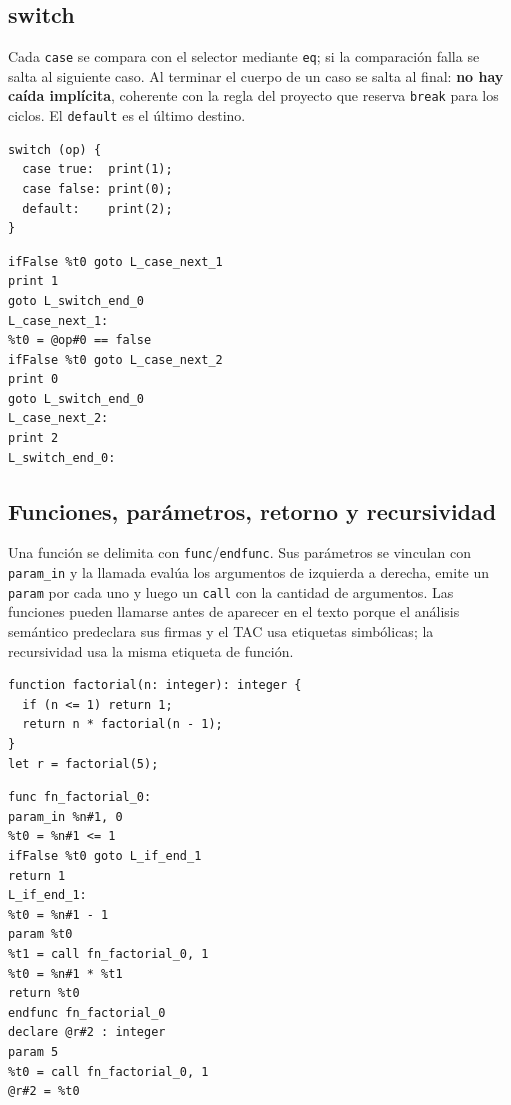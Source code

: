 \documentclass[11pt,a4paper]{article}
\begin{document}
\subsection{switch}

Cada \texttt{case} se compara con el selector mediante \texttt{eq}; si la
comparación falla se salta al siguiente caso. Al terminar el cuerpo de un caso
se salta al final: \textbf{no hay caída implícita}, coherente con la regla del
proyecto que reserva \texttt{break} para los ciclos. El \texttt{default} es el
último destino.

\noindent
\begin{minipage}[t]{0.40\textwidth}
\begin{lstlisting}[language=Compiscript,style=sinnumero]
switch (op) {
  case true:  print(1);
  case false: print(0);
  default:    print(2);
}
\end{lstlisting}
\end{minipage}\hfill
\begin{minipage}[t]{0.54\textwidth}
\begin{lstlisting}[language=TAC,style=sinnumero]
%t0 = @op#0 == true
ifFalse %t0 goto L_case_next_1
print 1
goto L_switch_end_0
L_case_next_1:
%t0 = @op#0 == false
ifFalse %t0 goto L_case_next_2
print 0
goto L_switch_end_0
L_case_next_2:
print 2
L_switch_end_0:
\end{lstlisting}
\end{minipage}

\subsection{Funciones, parámetros, retorno y recursividad}

Una función se delimita con \texttt{func}/\texttt{endfunc}. Sus parámetros se
vinculan con \texttt{param\_in} y la llamada evalúa los argumentos de izquierda
a derecha, emite un \texttt{param} por cada uno y luego un \texttt{call} con la
cantidad de argumentos. Las funciones pueden llamarse antes de aparecer en el
texto porque el análisis semántico predeclara sus firmas y el TAC usa etiquetas
simbólicas; la recursividad usa la misma etiqueta de función.

\noindent
\begin{minipage}[t]{0.42\textwidth}
\begin{lstlisting}[language=Compiscript,style=sinnumero]
function factorial(n: integer): integer {
  if (n <= 1) return 1;
  return n * factorial(n - 1);
}
let r = factorial(5);
\end{lstlisting}
\end{minipage}\hfill
\begin{minipage}[t]{0.52\textwidth}
\begin{lstlisting}[language=TAC,style=sinnumero]
func fn_factorial_0:
param_in %n#1, 0
%t0 = %n#1 <= 1
ifFalse %t0 goto L_if_end_1
return 1
L_if_end_1:
%t0 = %n#1 - 1
param %t0
%t1 = call fn_factorial_0, 1
%t0 = %n#1 * %t1
return %t0
endfunc fn_factorial_0
declare @r#2 : integer
param 5
%t0 = call fn_factorial_0, 1
@r#2 = %t0
\end{lstlisting}
\end{minipage}
\end{document}
